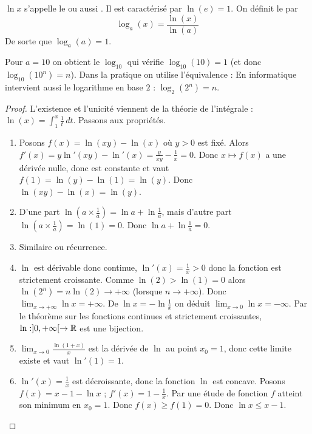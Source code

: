 \documentclass[class=report,crop=false]{standalone}
\begin{document}

\begin{remarque*}
$\ln x$ s'appelle le  ou aussi .
Il est caractérisé par $\ln(e)=1$.
On définit le  par
$$\log_a(x) = \frac{\ln(x)}{\ln(a)}$$
De sorte que $\log_a(a)=1$.

Pour $a=10$ on obtient le  $\log_{10}$ qui vérifie
$\log_{10} (10)=1$ (et donc $\log_{10}(10^n)=n$).
Dans la pratique on utilise l'équivalence : 
En informatique intervient aussi le logarithme en base $2$ : $\log_2(2^n)=n$.
\end{remarque*}

\begin{proof}
L'existence et l'unicité viennent de la théorie de l'intégrale :
  $\ln(x) = \int_1^x \frac1t \, dt$.
Passons aux propriétés.
\begin{enumerate}
  \item Posons $f(x)=\ln(xy)-\ln(x)$ où $y>0$ est fixé.
  Alors $f'(x)=y\ln'(xy)-\ln'(x)=\frac{y}{xy}-\frac1x = 0$.
  Donc $x \mapsto f(x)$ a une dérivée nulle,
  donc est constante et vaut $f(1)=\ln(y)-\ln(1)=\ln(y)$. Donc
  $\ln(xy)-\ln(x)=\ln(y)$.

  \item D'une part $\ln (a \times \frac 1a) = \ln a + \ln \frac 1a$, mais d'autre part
  $\ln (a \times \frac 1a) = \ln(1) = 0$. Donc $\ln a + \ln \frac 1a=0$.

  \item Similaire ou récurrence.

  \item $\ln$ est dérivable donc continue, $\ln'(x)=\frac 1x >0$
  donc la fonction est strictement croissante.
  Comme $\ln(2)>\ln(1)=0$ alors $\ln(2^n)=n\ln(2) \to +\infty$ (lorsque $n\to+\infty$).
  Donc $\lim_{x\to+\infty} \ln x = +\infty$. De $\ln x= -\ln \frac{1}{x} $
   on déduit $\lim_{x\to 0} \ln x = -\infty$.
  Par le théorème sur les fonctions continues et strictement croissantes,
  $\ln : ]0,+\infty[ \to \mathbb{R}$ est une bijection.

  \item $\lim_{x\to0}\frac{\ln(1+x)}{x}$ est la dérivée de $\ln$ au point $x_0=1$,
  donc cette limite existe et vaut $\ln'(1)=1$.

  \item $\ln'(x)=\frac1x$ est décroissante, donc la fonction $\ln$ est concave.
  Posons $f(x) =  x-1 - \ln x$ ; $f'(x)= 1 -\frac1x$. Par une étude de fonction $f$ atteint son minimum en $x_0=1$.
  Donc $f(x)\ge f(1)=0$. Donc $\ln x \le x-1$.

\end{enumerate}


\end{proof}
\end{document}
